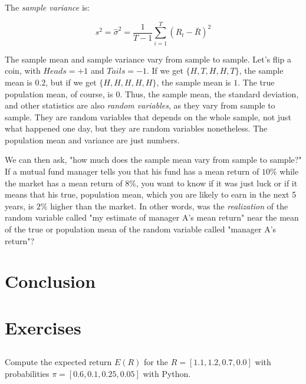 The \textit{sample variance} is:

\begin{equation}
    s^2 = \hat{\sigma}^2 = \frac{1}{T - 1}\sum_{i=1}^T (R_t - \bar{R})^2
\end{equation}

The sample mean and sample variance vary from sample to sample.
Let's flip a coin, with $Heads = +1$ and $Tails = -1$.
If we get $\{H, T, H, H, T\}$, the sample mean is 
$0.2$, but if we get $\{H, H, H, H, H\}$, the sample mean is $1$.
The true population mean, of course, is $0$.
Thus, the sample mean, the standard deviation, and other 
statistics are also \textit{random variables}, as 
they vary from sample to sample.
They are random variables that depends on the whole sample, 
not just what happened one day, but they are random variables
nonetheless. The population mean and variance are just 
numbers. 

We can then ask, "how much does the sample mean vary from
sample to sample?" If a mutual fund manager tells you
that his fund has a mean return of $10\%$ while the 
market has a mean return of $8\%$, you want to know 
if it was just luck or if it means that his true,
population mean, which you are likely to earn in the 
next 5 years, is $2\%$ higher than the market.
In other words, was the \textit{realization} of the
random variable called "my estimate of manager A's 
mean return" near the mean of the true or population mean
of the random variable called "manager A's return"?



\section{Conclusion}

\newpage
\section{Exercises}

\subsection{}

Compute the expected return $E(R)$ for the 
$R = [1.1, 1.2, 0.7, 0.0]$ with probabilities
$\pi = [0.6, 0.1, 0.25, 0.05]$ with Python.

\subsection{}

